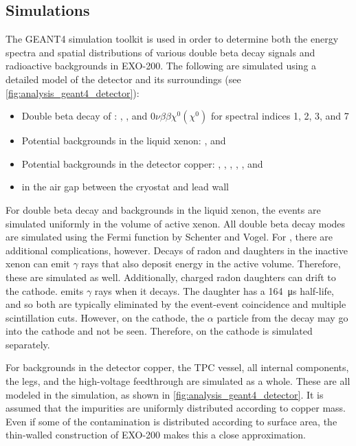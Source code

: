 \documentclass[herrin-thesis.tex]{subfiles}
\begin{document}
\subsection{Simulations}
\label{sec:analysis_simulations}
The GEANT4 simulation toolkit\cite{Agostinelli:2003fk} is used in order to determine both the energy spectra and spatial distributions of various double beta decay signals and radioactive backgrounds in EXO-200. The following are simulated using a detailed model of the detector and its surroundings (see \cref{fig:analysis_geant4_detector}):
\begin{itemize}
\item Double beta decay of :
	\twonu{},
	\zeronu{},
	and \(0\nu\beta\beta\chi^{0}(\chi^{0})\) for spectral indices 1, 2, 3, and 7
\item Potential backgrounds in the liquid xenon:
	,
	and 
\item Potential backgrounds in the detector copper:
	, 
	,
	,
	,
	,
	and 
\item {} in the air gap between the cryostat and lead wall
\end{itemize}

For double beta decay and backgrounds in the liquid xenon, the events are simulated uniformly in the volume of active xenon. All double beta decay modes are simulated using the Fermi function by Schenter and Vogel\cite{Schenter:1983uq}. For , there are additional complications, however. Decays of radon and daughters in the inactive xenon can emit \(\gamma\) rays that also deposit energy in the active volume. Therefore, these are simulated as well. Additionally, charged radon daughters can drift to the cathode.  emits \(\gamma\) rays when it decays. The daughter  has a \SI{164}{\micro\s} half-life, and so both are typically eliminated by the event-event coincidence and multiple scintillation cuts. However, on the cathode, the \(\alpha\) particle from the  decay may go into the cathode and not be seen. Therefore,  on the cathode is simulated separately.

For backgrounds in the detector copper, the TPC vessel, all internal components, the legs, and the high-voltage feedthrough are simulated as a whole. These are all modeled in the simulation, as shown in \cref{fig:analysis_geant4_detector}. It is assumed that the impurities are uniformly distributed according to copper mass. Even if some of the contamination is distributed according to surface area, the thin-walled construction of EXO-200 makes this a close approximation.
\end{document}
